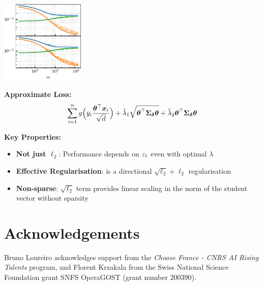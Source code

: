 \documentclass[a0paper,fleqn]{betterportraitposter}
\theoremstyle{plain}
\theoremstyle{definition}
\theoremstyle{remark}
\begin{document}
{\begin{multicols}{3}
\begin{center}
\includegraphics[width=0.3\textwidth]{Assets/effective_regularisation.pdf}
\end{center}

\textbf{Approximate Loss:}
\begin{equation}
    \sum_{i = 1}^{n} 
    g \Big( y_{i} \frac{\boldsymbol{\theta}^\top \boldsymbol{x}_{i}}{\sqrt{d}} \Big) 
    + \tilde{\lambda}_1 \sqrt{\boldsymbol{\theta}^\top \boldsymbol{\Sigma}_{\boldsymbol{\delta}} \boldsymbol{\theta}} + \tilde{\lambda}_2 \boldsymbol{\theta}^\top \boldsymbol{\Sigma}_{\boldsymbol{\delta}} \boldsymbol{\theta}
\end{equation}

\textbf{Key Properties:}
\begin{itemize}
    \item \textbf{Not just $\ell_2$}: Performance depends on $\varepsilon_t$ even with optimal $\lambda$
    \item \textbf{Effective Regularisation}: is a directional \(\sqrt{\ell_2} + \ell_2\) regularisation
    \item \textbf{Non-sparse}: $\sqrt{\ell_2}$ term provides linear scaling in the norm of the student vector without sparsity
\end{itemize}

\section{Acknowledgements}

Bruno Loureiro acknowledges support from the \textit{Choose France - CNRS AI Rising Talents} program, and Florent Krzakala from the Swiss National Science Foundation grant SNFS OperaGOST  (grant number $200390$).

\end{multicols}
}




\end{document}
